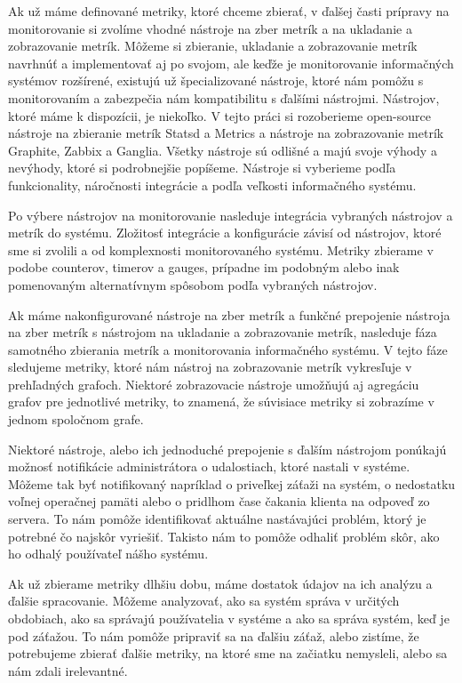 \documentclass[a4paper, upjsfrontpage, thesismargins, thesislinespacing]{rnthesis}
\begin{document}
Ak už máme definované metriky, ktoré chceme zbierať, v ďalšej časti prípravy na monitorovanie si zvolíme vhodné nástroje na zber 	metrík a na ukladanie a zobrazovanie metrík.
Môžeme si zbieranie, ukladanie a zobrazovanie metrík navrhnúť a implementovať aj po svojom, ale keďže je monitorovanie informačných systémov rozšírené, existujú už špecializované nástroje, ktoré nám pomôžu s monitorovaním a zabezpečia nám kompatibilitu s ďalšími nástrojmi.
Nástrojov, ktoré máme k dispozícii, je niekoľko.
V tejto práci si rozoberieme open-source nástroje na zbieranie metrík Statsd a Metrics a nástroje na zobrazovanie metrík Graphite, Zabbix a Ganglia.
Všetky nástroje sú odlišné a majú svoje výhody a nevýhody, ktoré si podrobnejšie popíšeme.
Nástroje si vyberieme podľa funkcionality, náročnosti integrácie a podľa veľkosti informačného systému.

Po výbere nástrojov na monitorovanie nasleduje integrácia vybraných nástrojov a metrík do systému.
Zložitosť integrácie a konfigurácie závisí od nástrojov, ktoré sme si zvolili a od komplexnosti monitorovaného systému.
Metriky zbierame v podobe counterov, timerov a gauges, prípadne im podobným alebo inak pomenovaným alternatívnym spôsobom podľa vybraných nástrojov.

Ak máme nakonfigurované nástroje na zber metrík a funkčné prepojenie nástroja na zber metrík s nástrojom na ukladanie a zobrazovanie metrík, nasleduje fáza samotného zbierania metrík a monitorovania informačného systému.
V tejto fáze sledujeme metriky, ktoré nám nástroj na zobrazovanie metrík vykresľuje v prehľadných grafoch.
Niektoré zobrazovacie nástroje umožňujú aj agregáciu grafov pre jednotlivé metriky, to znamená, že súvisiace metriky si zobrazíme v jednom spoločnom grafe. 

Niektoré nástroje, alebo ich jednoduché prepojenie s ďalším nástrojom ponúkajú možnosť notifikácie administrátora o udalostiach, ktoré nastali v systéme.
Môžeme tak byť notifikovaný napríklad o priveľkej záťaži na systém, o nedostatku voľnej operačnej pamäti alebo o pridlhom čase čakania klienta na odpoveď zo servera.
To nám pomôže identifikovať aktuálne nastávajúci problém, ktorý je potrebné čo najskôr vyriešiť.
Takisto nám to pomôže odhaliť problém skôr, ako ho odhalý používateľ nášho systému.

Ak už zbierame metriky dlhšiu dobu, máme dostatok údajov na ich analýzu a ďalšie spracovanie.
Môžeme analyzovať, ako sa systém správa v určitých obdobiach, ako sa správajú používatelia v systéme a ako sa správa systém, keď je pod záťažou. To nám pomôže pripraviť sa na ďalšiu záťaž, alebo zistíme, že potrebujeme zbierať ďalšie metriky, na ktoré sme na začiatku nemysleli, alebo sa nám zdali irelevantné.
\end{document}
